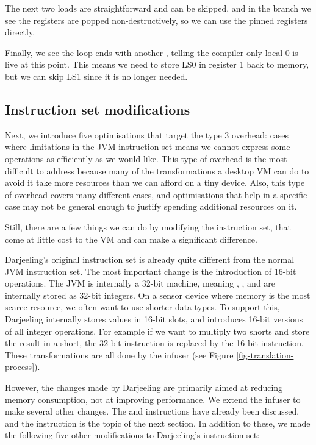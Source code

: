 The next two loads are straightforward and can be skipped, and in the branch we see the registers are popped non-destructively, so we can use the pinned registers directly.

Finally, we see the loop ends with another , telling the compiler only local 0 is live at this point. This means we need to store LS0 in register 1 back to memory, but we can skip LS1 since it is no longer needed.

\subsection{Instruction set modifications}
Next, we introduce five optimisations that target the type 3 overhead: cases where limitations in the JVM instruction set means we cannot express some operations as efficiently as we would like. This type of overhead is the most difficult to address because many of the transformations a desktop VM can do to avoid it take more resources than we can afford on a tiny device. Also, this type of overhead covers many different cases, and optimisations that help in a specific case may not be general enough to justify spending additional resources on it.

Still, there are a few things we can do by modifying the instruction set, that come at little cost to the VM and can make a significant difference.

Darjeeling's original instruction set is already quite different from the normal JVM instruction set. The most important change is the introduction of 16-bit operations. The JVM is internally a 32-bit machine, meaning , , and  are internally stored as 32-bit integers. On a sensor device where memory is the most scarce resource, we often want to use shorter data types. To support this, Darjeeling internally stores values in 16-bit slots, and introduces 16-bit versions of all integer operations. For example if we want to multiply two shorts and store the result in a short, the 32-bit  instruction is replaced by the 16-bit  instruction. These transformations are all done by the infuser (see Figure \ref{fig-translation-process}).

However, the changes made by Darjeeling are primarily aimed at reducing memory consumption, not at improving performance. We extend the infuser to make several other changes. The  and  instructions have already been discussed, and the  instruction is the topic of the next section. In addition to these, we made the following five other modifications to Darjeeling's instruction set:

